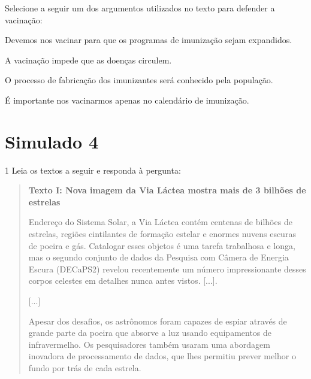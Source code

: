 Selecione a seguir um dos argumentos utilizados no texto para defender a
vacinação:

\begin{escolha}
\item Devemos nos vacinar para que os programas de imunização sejam expandidos.

\item A vacinação impede que as doenças circulem.

\item O processo de fabricação dos imunizantes será conhecido pela população.

\item É importante nos vacinarmos apenas no calendário de imunização.
\end{escolha}


\chapter{Simulado 4}

\num{1} Leia os textos a seguir e responda à pergunta:

\begin{quote}
\textbf{Texto I: Nova imagem da Via Láctea mostra mais de 3 bilhões de
estrelas}

Endereço do Sistema Solar, a Via Láctea contém centenas de bilhões de
estrelas, regiões cintilantes de formação estelar e enormes nuvens
escuras de poeira e gás. Catalogar esses objetos é uma tarefa trabalhosa
e longa, mas o segundo conjunto de dados da Pesquisa com Câmera de
Energia Escura (DECaPS2) revelou recentemente um número impressionante
desses corpos celestes em detalhes nunca antes vistos. {[}...{]}.

{[}...{]}

Apesar dos desafios, os astrônomos foram capazes de espiar através de
grande parte da poeira que absorve a luz usando equipamentos de
infravermelho. Os pesquisadores também usaram uma abordagem inovadora de
processamento de dados, que lhes permitiu prever melhor o fundo por trás
de cada estrela.

\end{quote}

